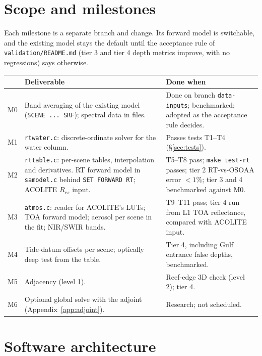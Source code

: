 \documentclass[11pt]{article}
\numberwithin{equation}{section}
\newcommand{\code}[1]{\texttt{#1}}
\begin{document}
\section{Scope and milestones}\label{sec:milestones}

Each milestone is a separate branch and change. Its forward model is switchable, and the
existing model stays the default until the acceptance rule of \code{validation/README.md}
(tier 3 and tier 4 depth metrics improve, with no regressions) says otherwise.

\begin{longtable}{@{}p{1.1cm}p{5.6cm}p{7.6cm}@{}}
\toprule
& Deliverable & Done when\\
\midrule
\endhead
M0 & Band averaging of the existing model (\code{SCENE ... SRF}); spectral data in files. &
Done on branch \code{data-inputs}; benchmarked; adopted as the acceptance rule decides.\\
M1 & \code{rtwater.c}: discrete-ordinate solver for the water column. &
Passes tests T1--T4 (\S\ref{sec:tests}).\\
M2 & \code{rttable.c}: per-scene tables, interpolation and derivatives. RT forward model in
\code{samodel.c} behind \code{SET FORWARD RT}; ACOLITE $R_{rs}$ input. &
T5--T8 pass; \code{make test-rt} passes; tier 2 RT-vs-OSOAA error $<1\%$; tier 3 and 4
benchmarked against M0.\\
M3 & \code{atmos.c}: reader for ACOLITE's LUTs; TOA forward model; aerosol per scene in the fit;
NIR/SWIR bands. &
T9--T11 pass; tier 4 run from L1 TOA reflectance, compared with ACOLITE input.\\
M4 & Tide-datum offsets per scene; optically deep test from the table. &
Tier 4, including Gulf entrance false depths, benchmarked.\\
M5 & Adjacency (level 1). & Reef-edge 3D check (level 2); tier 4.\\
M6 & Optional global solve with the adjoint (Appendix~\ref{app:adjoint}). & Research; not
scheduled.\\
\bottomrule
\end{longtable}

\section{Software architecture}\label{sec:arch}
\end{document}
